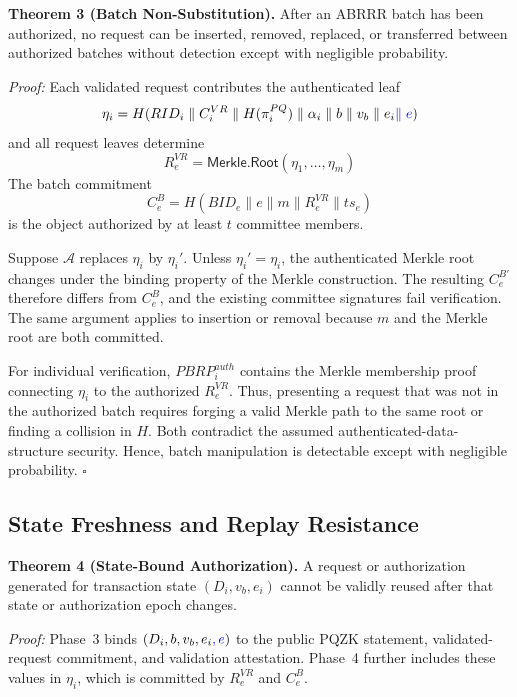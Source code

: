 \documentclass[lettersize,journal]{IEEEtran}
\begin{document}
\textbf{Theorem 3 (Batch Non-Substitution).}
After an ABRRR batch has been authorized, no request can be inserted,
removed, replaced, or transferred between authorized batches without
detection except with negligible probability.

\emph{Proof:}
Each validated request contributes the authenticated leaf
\begin{equation}
\eta_i=
H(RID_i\parallel C_i^{VR}\parallel H(\pi_i^{PQ})
\parallel\alpha_i\parallel b\parallel v_b\parallel e_i\textcolor{blue}{\parallel e})
\label{eq:sec_batch_leaf}
\end{equation}
and all request leaves determine
\begin{equation}
R_e^{VR}=
\mathsf{Merkle.Root}(\eta_1,\ldots,\eta_m)
\label{eq:sec_batch_root}
\end{equation}
The batch commitment
\begin{equation}
C_e^B=
H(BID_e\parallel e\parallel m\parallel
R_e^{VR}\parallel ts_e)
\label{eq:sec_batch_commit}
\end{equation}
is the object authorized by at least $t$ committee members.

Suppose $\mathcal{A}$ replaces $\eta_i$ by $\eta_i'$. Unless
$\eta_i'=\eta_i$, the authenticated Merkle root changes under the
binding property of the Merkle construction. The resulting
$C_e^{B'}$ therefore differs from $C_e^B$, and the existing committee
signatures fail verification. The same argument applies to insertion
or removal because $m$ and the Merkle root are both committed.

For individual verification, $PBRP_i^{auth}$ contains the Merkle
membership proof connecting $\eta_i$ to the authorized
$R_e^{VR}$. Thus, presenting a request that was not in the authorized
batch requires forging a valid Merkle path to the same root or finding
a collision in $H$. Both contradict the assumed authenticated-data-
structure security. Hence, batch manipulation is detectable except
with negligible probability.
\hfill$\square$


\subsection{State Freshness and Replay Resistance}

\textbf{Theorem 4 (State-Bound Authorization).}
A request or authorization generated for transaction state
$(D_i,v_b,e_i)$ cannot be validly reused after that state or
authorization epoch changes.

\emph{Proof:}
Phase~3 binds $(D_i,b,v_b,e_i\textcolor{blue}{,e})$ to the public PQZK statement,
validated-request commitment, and validation attestation. Phase~4
further includes these values in $\eta_i$, which is committed by
$R_e^{VR}$ and $C_e^B$.
\end{document}
